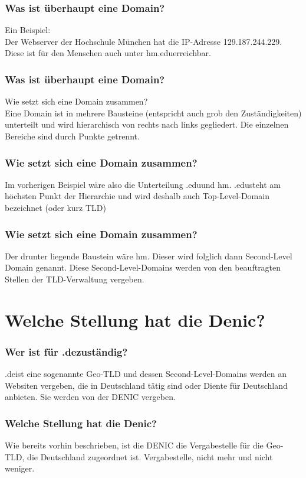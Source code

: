 \documentclass{beamer}
\begin{document}
	\begin{frame}
		\frametitle{Was ist überhaupt eine Domain?}
		Ein Beispiel:
		\\
		Der Webserver der Hochschule München hat die IP-Adresse 129.187.244.229. Diese ist für den Menschen auch unter \glqq hm.edu\grqq erreichbar.
	\end{frame}
	
	
	\begin{frame}
		\frametitle{Was ist überhaupt eine Domain?}
		Wie setzt sich eine Domain zusammen?
		\\
		
		Eine Domain ist in mehrere Bausteine (entspricht auch grob den Zuständigkeiten) unterteilt und wird hierarchisch von rechts nach links gegliedert. Die einzelnen Bereiche sind durch Punkte getrennt.
	\end{frame}
	
	\begin{frame}
		\frametitle{Wie setzt sich eine Domain zusammen?}
		Im vorherigen Beispiel wäre also die Unterteilung \glqq.edu\grqq und \glqq hm\grqq. \glqq.edu\grqq steht am höchsten Punkt der Hierarchie und wird deshalb auch Top-Level-Domain bezeichnet (oder kurz TLD)
	\end{frame}
	
	
	\begin{frame}
		\frametitle{Wie setzt sich eine Domain zusammen?}
		Der drunter liegende Baustein wäre \glqq hm\grqq. Dieser wird folglich dann Second-Level Domain genannt. Diese Second-Level-Domains werden von den beauftragten Stellen der TLD-Verwaltung vergeben.
	\end{frame}
	
	\section{Welche Stellung hat die Denic?}
	
	\begin{frame}
		\frametitle{Wer ist für \glqq.de\grqq zuständig?}
		\glqq.de\grqq ist eine sogenannte Geo-TLD und dessen Second-Level-Domains werden an Websiten vergeben, die in Deutschland tätig sind oder Diente für Deutschland anbieten. Sie werden von der DENIC vergeben.
	\end{frame}
	
	\begin{frame}
		\frametitle{Welche Stellung hat die Denic?}
		Wie bereits vorhin beschrieben, ist die DENIC die Vergabestelle für die Geo-TLD, die Deutschland zugeordnet ist. Vergabestelle, nicht mehr und nicht weniger.
	\end{frame}
	
\end{document}
